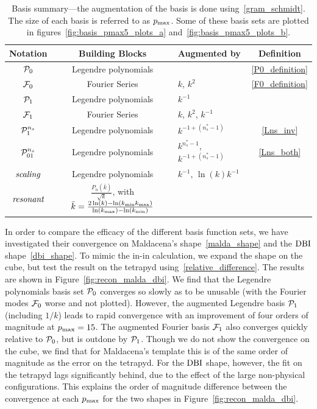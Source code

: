 \begin{table}[h!]
  \begin{center}
    \begin{tabular}{c|c|l|c}
      \textbf{Notation} & \textbf{Building Blocks} & \textbf{Augmented by} & \textbf{Definition}\\
      \hline
        $\mathcal{P}_0$  & Legendre polynomials &                & \eqref{P0_definition}\\
        $\mathcal{F}_0$  & Fourier Series & $k$, $k^2$           & \eqref{F0_definition}\\
        $\mathcal{P}_1$   & Legendre polynomials & $k^{-1}$       & \\
        $\mathcal{F}_1$   & Fourier Series & $k$, $k^2$, $k^{-1}$ & \\
        $\mathcal{P}^{n_s}_1$  & Legendre polynomials & $k^{-1+(n_s^{*}-1)}$   & \eqref{Lns_inv}\\
        $\mathcal{P}^{n_s}_{01}$ & Legendre polynomials& $k^{n_s^{*}-1}$, $k^{-1+(n_s^{*}-1)}$ & \eqref{Lns_both}\\
        $\textit{scaling}$ & Legendre polynomials& $k^{-1}$, $\ln(k)k^{-1}$ &\\
        $\textit{resonant}$ & $\frac{P_n(\bar{k})}{\sqrt{k}}$, with $\bar{k}=\frac{2\ln(k)-\ln({k_\text{min}}{k_\text{max}})}{\ln({k_\text{max}})-\ln({k_\text{min}})}$& &\\
    \end{tabular}
    \caption{
          Basis summary---the augmentation of the basis is done
          using~\eqref{gram_schmidt}. The size of each basis is
          referred to as $p_\text{max}$. Some of these basis sets are
          plotted in figures~\ref{fig:basis_pmax5_plots_a}
          and~\ref{fig:basis_pmax5_plots_b}.
      }\label{tab:basis_summary}
  \end{center}
\end{table}

In order to compare the efficacy of the different basis function sets,
we have investigated their convergence on Maldacena's shape~\eqref{malda_shape} and the $\text{DBI}$ shape~\eqref{dbi_shape}.
To mimic the in-in calculation, we expand the shape on the cube, but test the result on the tetrapyd
using~\eqref{relative_difference}.
The results are shown in Figure~\ref{fig:recon_malda_dbi}.
We find that the Legendre polynomials basis set $\mathcal{P}_0$ converges so slowly as to be unusable
(with the Fourier modes $\mathcal{F}_0$ worse and not plotted).
However, the augmented Legendre basis $\mathcal{P}_1$ (including $1/k$) leads to rapid convergence with an improvement of four orders
of magnitude at $p_\text{max}=15$. The augmented Fourier basis $\mathcal{F}_1$ also converges
quickly relative to $\mathcal{P}_0$, but is outdone by $\mathcal{P}_1$.
Though we do not show the convergence on the cube, we find that for Maldacena's
template this is of the same order of magnitude as
the error on the tetrapyd.  For the $\text{DBI}$ shape, however, the
fit on the tetrapyd lags significantly behind, due to the effect
of the large non-physical configurations. This explains the order of
magnitude difference between the convergence at
each $p_\text{max}$ for the two shapes in Figure~\ref{fig:recon_malda_dbi}.


